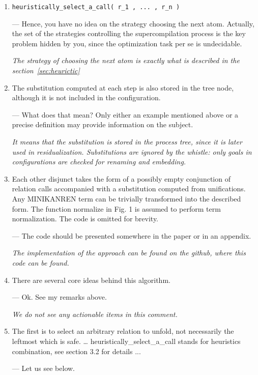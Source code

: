 \begin{enumerate}
  \item{\verb!heuristically_select_a_call( r_1 , ... , r_n )!

  --- Hence, you have no idea on the strategy choosing the next atom. Actually, the set of the strategies controlling the supercompilation process is the key problem hidden by you, since the optimization task per se is undecidable.

  \emph{The strategy of choosing the next atom is exactly what is described in the section~\ref{sec:heurictic}}
  }

  \item{
    The substitution computed at each step is also stored in the tree node, although it is not included in the configuration.

    --- What does that mean? Only either an example mentioned above or a precise definition may provide information on the subject.

    \emph{It means that the substitution is stored in the process tree, since it is later used in residualization. Substitutions are ignored by the whistle: only goals in configurations are checked for renaming and embedding.}
  }

  \item{
    Each other disjunct takes the form of a possibly empty conjunction of relation calls accompanied with a substitution computed from unifications. Any MINIKANREN term can be trivially transformed into the described form. The function normalize in Fig. 1 is assumed to perform term normalization. The code is omitted for brevity.

    --- The code should be presented somewhere in the paper or in an appendix.

    \emph{The implementation of the approach can be found on the github, where this code can be found.}
  }

  \item{
    There are several core ideas behind this algorithm.

    --- Ok. See my remarks above.

    \emph{We do not see any actionable items in this comment.}
  }

  \item{
    The first is to select an arbitrary relation to unfold, not necessarily the leftmost which is safe. … heuristically_select_a_call stands for heuristics combination, see section 3.2 for details ...

    --- Let us see below.

}
\end{enumerate}
